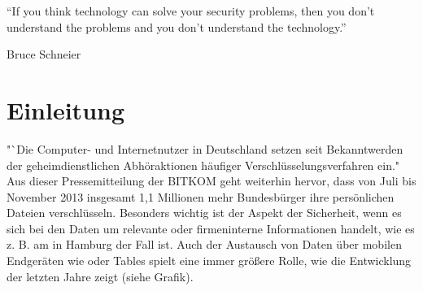\documentclass[10pt, a4paper,headsepline]{scrreprt}
\begin{document}
\pagestyle{empty}




\vspace*{\fill}
\begin{center}
“If you think technology can solve your security problems, then you don’t understand the problems and you don’t understand the technology.”
\end{center}
\begin{flushright}
Bruce Schneier
\end{flushright}
\vspace*{\fill}

\clearpage%
\begingroup
  \renewcommand*{\chapterpagestyle}{empty}
  \pagestyle{empty}
  \tableofcontents
  \listoffigures
  \clearpage
\endgroup


\fancyhead[L]{\nouppercase{\leftmark}} %

\chapter{Einleitung}
\setcounter{page}{1}
\pagestyle{fancy}
"`Die Computer- und Internetnutzer in Deutschland setzen seit Bekanntwerden der geheimdienstlichen Abhöraktionen häufiger Verschlüsselungsverfahren ein." \cite{website:bitkom-verschl} 
Aus dieser Pressemitteilung der BITKOM geht weiterhin hervor, dass von Juli bis November 2013 insgesamt 1,1 Millionen mehr Bundesbürger ihre persönlichen Dateien verschlüsseln. Besonders wichtig ist der Aspekt der Sicherheit, wenn es sich bei den Daten um relevante oder firmeninterne Informationen handelt, wie es z. B. am  in Hamburg der Fall ist. Auch der Austausch von Daten über mobilen Endgeräten wie  oder Tables spielt eine immer größere Rolle, wie die Entwicklung der letzten Jahre zeigt (siehe Grafik). \\
\end{document}
